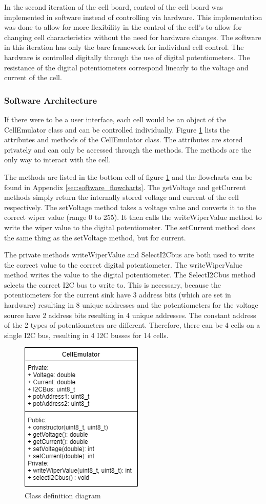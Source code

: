 In the second iteration of the cell board, control of the cell board was implemented in software instead of controlling via hardware.
This implementation was done to allow for more flexibility in the control of the cell's to allow for changing cell characteristics without the need for hardware changes.
The software in this iteration has only the bare framework for individual cell control.
The hardware is controlled digitally through the use of digital potentiometers. The resistance of the digital potentiometers correspond linearly to the voltage and current of the cell.

\subsubsection{Software Architecture}
If there were to be a user interface, each cell would be an object of the CellEmulator class and can be controlled individually. Figure \ref{fig:classDiagram} lists the attributes and methods of the CellEmulator class. The attributes are stored privately and can only be accessed through the methods. The methods are the only way to interact with the cell. 

The methods are listed in the bottom cell of figure \ref{fig:classDiagram} and the flowcharts can be found in Appendix \ref{sec:software_flowcharts}. The getVoltage and getCurrent methods simply return the internally stored voltage and current of the cell respectively. The setVoltage method takes a voltage value and converts it to the correct wiper value (range 0 to 255). It then calls the writeWiperValue method to write the wiper value to the digital potentiometer. The setCurrent method does the same thing as the setVoltage method, but for current.

The private methods writeWiperValue and SelectI2Cbus are both used to write the correct value to the correct digital potentiometer. The writeWiperValue method writes the value to the digital potentiometer. The SelectI2Cbus method selects the correct I2C bus to write to. 
This is necessary, because the potentiometers for the current sink have 3 address bits (which are set in hardware) resulting in 8 unique addresses and the potentiometers for the voltage source have 2 address bits resulting in 4 unique addresses. The constant address of the 2 types of potentiometers are different. Therefore, there can be 4 cells on a single I2C bus, resulting in 4 I2C busses for 14 cells. 

\begin{figure}[ht!]
    \centering
    \includegraphics[scale=0.7]{class.png}
    \caption{Class definition diagram}
    \label{fig:classDiagram}
\end{figure}
